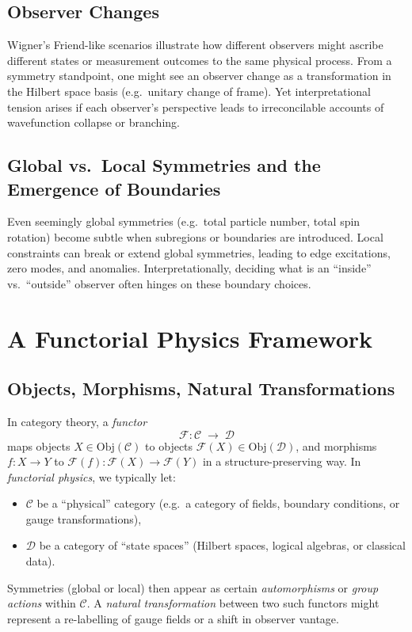 \documentclass[12pt]{article}
\begin{document}
\subsection{Observer Changes}
Wigner's Friend-like scenarios illustrate how different observers might ascribe different 
states or measurement outcomes to the same physical process. From a symmetry standpoint, 
one might see an observer change as a transformation in the Hilbert space basis (e.g.\ 
unitary change of frame). Yet interpretational tension arises if each observer's perspective 
leads to irreconcilable accounts of wavefunction collapse or branching.

\subsection{Global vs.\ Local Symmetries and the Emergence of Boundaries}
Even seemingly global symmetries (e.g.\ total particle number, total spin rotation) 
become subtle when subregions or boundaries are introduced. Local constraints can break or 
extend global symmetries, leading to edge excitations, zero modes, and anomalies. 
Interpretationally, deciding what is an “inside” vs.\ “outside” observer often hinges on 
these boundary choices.

\section{A Functorial Physics Framework}
\label{sec:Functorial}
\subsection{Objects, Morphisms, Natural Transformations}
In category theory, a \emph{functor}
\[
\mathcal{F} : \mathcal{C} \;\longrightarrow\; \mathcal{D}
\]
maps objects $X \in \mathrm{Obj}(\mathcal{C})$ to objects $\mathcal{F}(X) \in \mathrm{Obj}(\mathcal{D})$, 
and morphisms $f : X \to Y$ to $\mathcal{F}(f) : \mathcal{F}(X) \to \mathcal{F}(Y)$ in a structure-preserving way. 
In \emph{functorial physics}, we typically let:
\begin{itemize}[label=$\bullet$]
    \item $\mathcal{C}$ be a “physical” category (e.g.\ a category of fields, boundary conditions, or gauge transformations),
    \item $\mathcal{D}$ be a category of “state spaces” (Hilbert spaces, logical algebras, or classical data).
\end{itemize}
Symmetries (global or local) then appear as certain \emph{automorphisms} or \emph{group actions} within $\mathcal{C}$. 
A \emph{natural transformation} between two such functors might represent a re-labelling of gauge fields or 
a shift in observer vantage.
\end{document}
